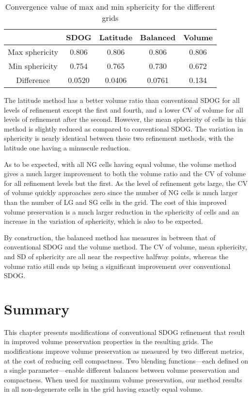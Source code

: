 \begin{table}[htp!]
	\centering
	\caption[Convergence values of max and min sphericity for the different grids]{
		Convergence value of max and min sphericity for the different grids
	}
	\begin{tabular}{@{} c c c c c @{}}
		\toprule
		& SDOG   & Latitude & Balanced & Volume \\ \midrule
		Max sphericity & 0.806  & 0.806    & 0.806    & 0.806  \\
		Min sphericity & 0.754  & 0.765    & 0.730    & 0.672  \\
		Difference     & 0.0520 & 0.0406   & 0.0761   & 0.134  \\ \bottomrule
	\end{tabular}
	\label{tab:results-sph}
\end{table}


The latitude method has a better volume ratio than conventional SDOG for all levels of refinement except the first and fourth, and a lower CV of volume for all levels of refinement after the second.
However, the mean sphericity of cells in this method is slightly reduced as compared to conventional SDOG.
The variation in sphericity is nearly identical between these two refinement methods, with the latitude one having a minuscule reduction.


As to be expected, with all NG cells having equal volume, the volume method gives a much larger improvement to both the volume ratio and the CV of volume for all refinement levels but the first.
As the level of refinement gets large, the CV of volume quickly approaches zero since the number of NG cells is much larger than the number of LG and SG cells in the grid.
The cost of this improved volume preservation is a much larger reduction in the sphericity of cells and an increase in the variation of sphericity, which is also to be expected.


By construction, the balanced method has measures in between that of conventional SDOG and the volume method.
The CV of volume, mean sphericity, and SD of sphericity are all near the respective halfway points, whereas the volume ratio still ends up being a significant improvement over conventional SDOG.

\section{Summary}
This chapter presents modifications of conventional SDOG refinement that result in improved volume preservation properties in the resulting grids.
The modifications improve volume preservation as measured by two different metrics, at the cost of reducing cell compactness.
Two blending functions---each defined on a single parameter---enable different balances between volume preservation and compactness.
When used for maximum volume preservation, our method results in all non-degenerate cells in the grid having exactly equal volume.
